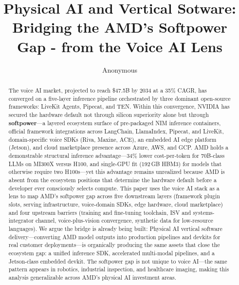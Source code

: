 \documentclass[blind]{gtac}
\title{{Physical AI and Vertical Sotware: Bridging the AMD's Softpower Gap - from the Voice AI Lens}}
\author{Anonymous}
\begin{document}
\maketitle

\pagestyle{fancy}
\fancyhf{}
\cfoot{\thepage}
\renewcommand{\headrulewidth}{0pt}
\thispagestyle{fancy}

\begin{abstract}
The voice AI market, projected to reach \$47.5B by 2034 at a 35\% CAGR, has converged on a five-layer inference pipeline orchestrated by three dominant open-source frameworks: LiveKit Agents, Pipecat, and TEN. Within this convergence, NVIDIA has secured the hardware default not through silicon superiority alone but through \textbf{softpower}---a layered ecosystem surface of pre-packaged NIM inference containers, official framework integrations across LangChain, LlamaIndex, Pipecat, and LiveKit, domain-specific voice SDKs (Riva, Maxine, ACE), an embedded AI edge platform (Jetson), and cloud marketplace presence across Azure, AWS, and GCP. AMD holds a demonstrable structural inference advantage---34\% lower cost-per-token for 70B-class LLMs on MI300X versus H100, and single-GPU fit (192\,GB HBM3) for models that otherwise require two H100s---yet this advantage remains unrealized because AMD is absent from the ecosystem positions that determine the hardware default before a developer ever consciously selects compute. This paper uses the voice AI stack as a lens to map AMD's softpower gap across five downstream layers (framework plugin slots, serving infrastructure, voice-domain SDKs, edge hardware, cloud marketplace) and four upstream barriers (training and fine-tuning toolchain, ISV and systems-integrator channel, voice-plus-vision convergence, synthetic data for low-resource languages). We argue the bridge is already being built: Physical AI vertical software delivery---converting AMD model outputs into production pipelines and devkits for real customer deployments---is organically producing the same assets that close the ecosystem gap: a unified inference SDK, accelerated multi-modal pipelines, and a Jetson-class embedded devkit. The softpower gap is not unique to voice AI---the same pattern appears in robotics, industrial inspection, and healthcare imaging, making this analysis generalizable across AMD's physical AI investment areas.
\end{abstract}
\end{document}
